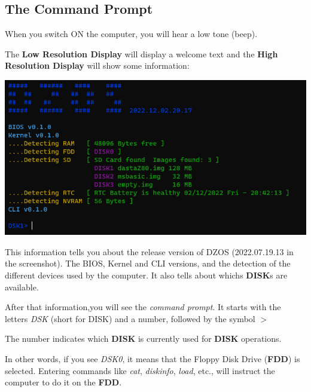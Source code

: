     \subsection{The Command Prompt}
    When you switch ON the computer, you will hear a low tone (beep).

    The \textbf{Low Resolution Display} will display a welcome text and the 
    \textbf{High Resolution Display} will show some information:

    \includegraphics[scale=0.6]{images/dzOS.png}

    This information tells you about the release version of DZOS (2022.07.19.13
    in the screenshot). The BIOS, Kernel and CLI versions, and the detection of
    the different devices used by the computer. It also tells about whichs 
    \textbf{DISK}s are available.

    After that information,you will see the \textit{command prompt}. It starts
    with the letters \textit{DSK} (short for DISK) and a number, followed by the
    symbol $>$

    The number indicates which \textbf{DISK} is currently used for \textbf{DISK}
    operations.

    In other words, if you see \textit{DSK0}, it means that the Floppy Disk Drive
    (\textbf{FDD}) is selected. Entering commands like \textit{cat},
    \textit{diskinfo}, \textit{load}, etc., will instruct the computer to do it
    on the \textbf{FDD}.